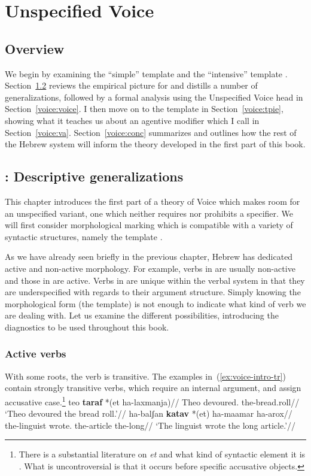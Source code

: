 \chapter{Unspecified Voice}
\label{chap:voice}

\section{Overview} \label{voice:intro}
We begin by examining the ``simple'' template {\tkal} and the ``intensive'' template {\tpie}. Section~\ref{voice:tkal} reviews the empirical picture for {\tkal} and distills a number of generalizations, followed by a formal analysis using the Unspecified Voice head in Section~\ref{voice:voice}. I then move on to the template {\tpie} in Section~\ref{voice:tpie}, showing what it teaches us about an agentive modifier which I call {\va} in Section~\ref{voice:va}. Section~\ref{voice:conc} summarizes and outlines how the rest of the Hebrew system will inform the theory developed in the first part of this book.

\section{\tkal: Descriptive generalizations} \label{voice:tkal}
This chapter introduces the first part of a theory of Voice which makes room for an unspecified variant, one which neither requires nor prohibits a specifier. We will first consider morphological marking which is compatible with a variety of syntactic structures, namely the template {\tkal}.

As we have already seen briefly in the previous chapter, Hebrew has dedicated active and non-active morphology. For example, verbs in {\tnif} are usually non-active and those in {\thif} are active. Verbs in {\tkal} are unique within the verbal system in that they are underspecified with regards to their argument structure. Simply knowing the morphological form (the template) is not enough to indicate what kind of verb we are dealing with. Let us examine the different possibilities, introducing the diagnostics to be used throughout this book.

	\subsection{Active verbs}
With some roots, the verb is transitive. The examples in~(\ref{ex:voice-intro-tr}) contain strongly transitive verbs, which require an internal argument, and assign accusative case.\footnote{There is a substantial literature on \emph{et} and what kind of syntactic element it is \citep{siloni97,danon01,borer13oup}. What is uncontroversial is that it occurs before specific accusative objects.}
\pex\label{ex:voice-intro-tr}
	\a \begingl
		\gla teo \textbf{taraf} *(et ha-laxmanja)//
		\glb Theo devoured.  the-bread.roll//
		\glft `Theo devoured the bread roll.'//
	\endgl
	\a \begingl
		\gla ha-balʃan \textbf{katav} *(et) ha-maamar ha-arox//
		\glb the-linguist wrote.  the-article the-long//
		\glft `The linguist wrote the long article.'//
	\endgl
\xe

